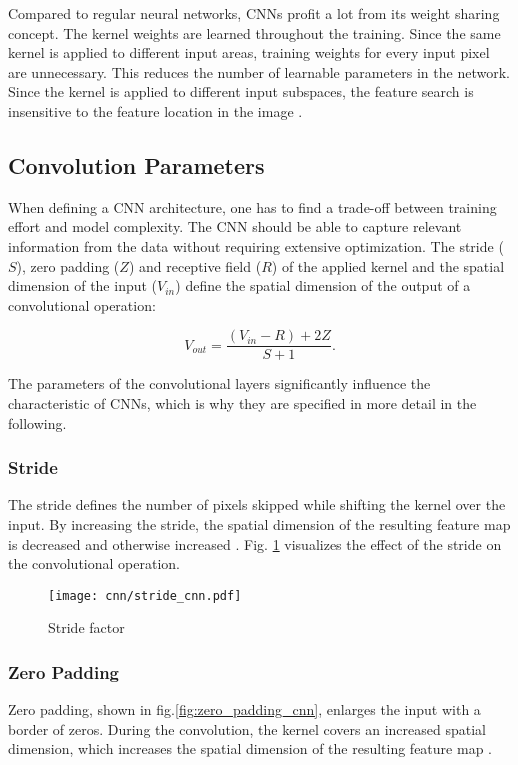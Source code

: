 Compared to regular neural networks, CNNs profit a lot from its weight sharing concept. The kernel weights are learned throughout the training. Since the same kernel is applied to different input areas, training weights for every input pixel are unnecessary. This reduces the number of learnable parameters in the network. Since the kernel is applied to different input subspaces, the feature search is insensitive to the feature location in the image \cite{OShea2015}.

\subsection{Convolution Parameters}
When defining a CNN architecture, one has to find a trade-off between training effort and model complexity. The CNN should be able to capture relevant information from the data without requiring extensive optimization.
The stride ($S$), zero padding ($Z$) and receptive field ($R$) of the applied kernel and the spatial dimension of the input ($V_{in}$) define the spatial dimension of the output of a convolutional operation:

\begin{equation}
  V_{out} = \frac{(V_{in}-R)+2Z}{S+1}.
  \label{eq:spatial_dimensionality_cnn_feature map}
\end{equation}

The parameters of the convolutional layers significantly influence the characteristic of CNNs, which is why they are specified in more detail in the following.

\subsubsection{Stride}
The stride defines the number of pixels skipped while shifting the kernel over the input. By increasing the stride, the spatial dimension of the resulting feature map is decreased and otherwise increased \cite{OShea2015}. Fig. \ref{fig:stride_cnn} visualizes the effect of the stride on the convolutional operation.

\begin{figure}[H]
  \centering
  \texttt{[image: cnn/stride\_cnn.pdf]}
  \caption {Stride factor}
  \label{fig:stride_cnn}
\end{figure}


\subsubsection{Zero Padding}
Zero padding, shown in fig.\ref{fig:zero_padding_cnn}, enlarges the input with a border of zeros. During the convolution, the kernel covers an increased spatial dimension, which increases the spatial dimension of the resulting feature map \cite{OShea2015}.

